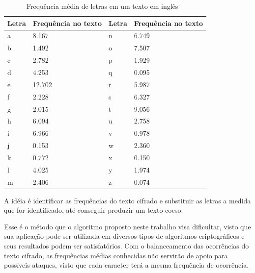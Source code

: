 \begin{table}[h]
\centering
\begin{tabular}{|l|l|l|l|}
	\hline
	Letra & Frequência no texto & Letra & Frequência no texto \\ \hline
	a & 8.167 & n & 6.749 \\ \hline
	b & 1.492 & o & 7.507 \\ \hline
	c & 2.782 & p & 1.929 \\ \hline
	d & 4.253 & q & 0.095 \\ \hline
	e & 12.702 & r & 5.987 \\ \hline
	f & 2.228 & s & 6.327 \\ \hline
	g & 2.015 & t & 9.056 \\ \hline
	h & 6.094 & u & 2.758 \\ \hline
	i & 6.966 & v & 0.978 \\ \hline
	j & 0.153 & w & 2.360 \\ \hline
	k & 0.772 & x & 0.150 \\ \hline
	l & 4.025 & y & 1.974 \\ \hline
	m & 2.406 & z & 0.074 \\ \hline
\end{tabular}
\caption[{Frequência média de letras em um texto em inglês}]{Frequência média de letras em um texto em inglês ~\cite{robert-lewand}} 
\end{table}

A idéia é identificar as frequências do texto cifrado e substituir as letras a medida que for identificado, até conseguir produzir um texto coeso.

Esse é o método que o algoritmo proposto neste trabalho visa dificultar, visto que sua aplicação pode ser utilizada em diversos tipos de algoritmos criptográficos e seus resultados podem ser satisfatórios. Com o balanceamento das ocorrências do texto cifrado, as frequências médias conhecidas não servirão de apoio para possíveis ataques, visto que cada caracter terá a mesma frequência de ocorrência.